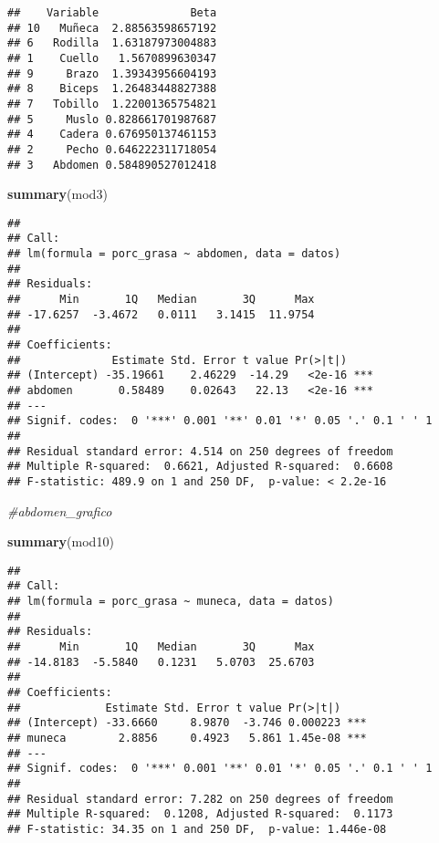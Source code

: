 \documentclass[
]{article}
\newenvironment{Shaded}{\begin{snugshade}}{\end{snugshade}}
\newcommand{\CommentTok}[1]{\textcolor[rgb]{0.56,0.35,0.01}{\textit{#1}}}
\newcommand{\FunctionTok}[1]{\textcolor[rgb]{0.13,0.29,0.53}{\textbf{#1}}}
\newcommand{\NormalTok}[1]{#1}
\begin{document}
\begin{verbatim}
##    Variable              Beta
## 10   Muñeca  2.88563598657192
## 6   Rodilla  1.63187973004883
## 1    Cuello   1.5670899630347
## 9     Brazo  1.39343956604193
## 8    Biceps  1.26483448827388
## 7   Tobillo  1.22001365754821
## 5     Muslo 0.828661701987687
## 4    Cadera 0.676950137461153
## 2     Pecho 0.646222311718054
## 3   Abdomen 0.584890527012418
\end{verbatim}

\begin{Shaded}
\begin{Highlighting}[]
\FunctionTok{summary}\NormalTok{(mod3)}
\end{Highlighting}
\end{Shaded}

\begin{verbatim}
## 
## Call:
## lm(formula = porc_grasa ~ abdomen, data = datos)
## 
## Residuals:
##      Min       1Q   Median       3Q      Max 
## -17.6257  -3.4672   0.0111   3.1415  11.9754 
## 
## Coefficients:
##              Estimate Std. Error t value Pr(>|t|)    
## (Intercept) -35.19661    2.46229  -14.29   <2e-16 ***
## abdomen       0.58489    0.02643   22.13   <2e-16 ***
## ---
## Signif. codes:  0 '***' 0.001 '**' 0.01 '*' 0.05 '.' 0.1 ' ' 1
## 
## Residual standard error: 4.514 on 250 degrees of freedom
## Multiple R-squared:  0.6621, Adjusted R-squared:  0.6608 
## F-statistic: 489.9 on 1 and 250 DF,  p-value: < 2.2e-16
\end{verbatim}

\begin{Shaded}
\begin{Highlighting}[]
\CommentTok{\#abdomen\_grafico}

\FunctionTok{summary}\NormalTok{(mod10)}
\end{Highlighting}
\end{Shaded}

\begin{verbatim}
## 
## Call:
## lm(formula = porc_grasa ~ muneca, data = datos)
## 
## Residuals:
##      Min       1Q   Median       3Q      Max 
## -14.8183  -5.5840   0.1231   5.0703  25.6703 
## 
## Coefficients:
##             Estimate Std. Error t value Pr(>|t|)    
## (Intercept) -33.6660     8.9870  -3.746 0.000223 ***
## muneca        2.8856     0.4923   5.861 1.45e-08 ***
## ---
## Signif. codes:  0 '***' 0.001 '**' 0.01 '*' 0.05 '.' 0.1 ' ' 1
## 
## Residual standard error: 7.282 on 250 degrees of freedom
## Multiple R-squared:  0.1208, Adjusted R-squared:  0.1173 
## F-statistic: 34.35 on 1 and 250 DF,  p-value: 1.446e-08
\end{verbatim}
\end{document}
